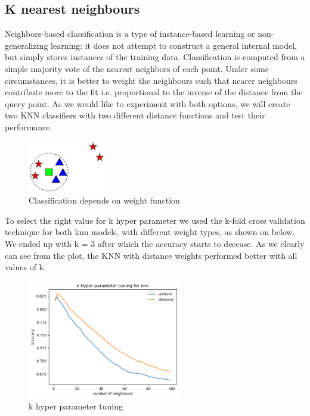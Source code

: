 \documentclass[12pt]{article}
\begin{document}
\subsection{K nearest neighbours}
Neighbors-based classification is a type of instance-based learning or non-generalizing learning: it does not attempt to construct a general internal model, but simply stores instances of the training data. Classification is computed from a simple majority vote of the nearest neighbors of each point. Under some circumstances, it is better to weight the neighbours such that nearer neighbours contribute more to the fit i.e. proportional to the inverse of the distance from the query point. As we would like to experiment with both options, we will create two KNN classifiers with two different distance functions and test their performance.
\begin{figure}[h]
\centering
\includegraphics[width=0.3\textwidth]{report_pics/knn}
\caption{Classification depends on weight function}
\end{figure}
To select the right value for k hyper parameter we used the k-fold cross validation technique for both knn models, with different weight types, as shown on below. We ended up with k = 3 after which the accuracy starts to decease. As we clearly can see from the plot, the KNN with distance weights performed better with all values of k.
\begin{figure}[h]
\centering
\includegraphics[width=0.6\textwidth]{Cross_valid_plots/k_hyper_fig}
\caption{k hyper parameter tuning}
\end{figure}


\newpage
\end{document}
